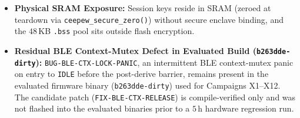 \documentclass[conference]{IEEEtran}
\begin{document}
\begin{itemize}
\item \textbf{Physical SRAM Exposure:} Session keys reside in SRAM (zeroed at teardown via \texttt{ceepew\_secure\_zero()}) without secure enclave binding, and the $48$\,KB \texttt{.bss} pool sits outside flash encryption.
\item \textbf{Residual BLE Context-Mutex Defect in Evaluated Build (\texttt{b263dde-dirty}):} \texttt{BUG-BLE-CTX-LOCK-PANIC}, an intermittent BLE context-mutex panic on entry to \texttt{IDLE} before the post-derive barrier, remains present in the evaluated firmware binary (\texttt{b263dde-dirty}) used for Campaigns X1--X12. The candidate patch (\texttt{FIX-BLE-CTX-RELEASE}) is compile-verified only and was not flashed into the evaluated binaries prior to a $5$\,h hardware regression run.
\end{itemize}
\end{document}

